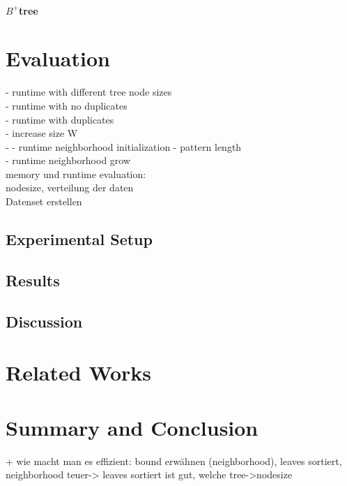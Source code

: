 \documentclass[abstracton,12pt]{scrreprt}
\begin{document}
\subsubsection{$B^+$tree}

\chapter{Evaluation}
\label{sec:Experimental}

- runtime with different tree node sizes \\
- runtime with no duplicates\\
- runtime with duplicates\\
- increase size W\\
- 
- runtime neighborhood initialization - pattern length\\
- runtime neighborhood grow\\

memory und runtime evaluation:\\ 
nodesize, verteilung der daten \\
Datenset erstellen \\


\section{Experimental Setup}
\section{Results}
\section{Discussion}


\chapter{Related Works}


\chapter{Summary and Conclusion}
\label{sec:Summary}

+ wie macht man es effizient: bound erwähnen (neighborhood), leaves sortiert, neighborhood teuer-> leaves sortiert ist gut, 
welche tree->nodesize
\end{document}

